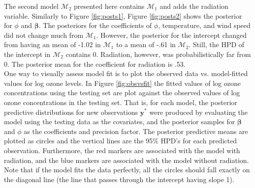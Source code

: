 \documentclass{../../tex_template/asaproc}
\newcommand{\y}{\bm y}
\newcommand{\M}{\mathcal{M}}
\begin{document}
The second model $\M_2$ presented here contains $\M_1$ and adds the radiation
variable. Similarly to Figure \ref{fig:posts1}, Figure \ref{fig:posts2} shows
the posterior for $\phi$ and $\bm\beta$.
The posteriors for the coefficients of $\phi$, temperature, and wind speed
did not change much from $\M_1$. However, the posterior for the intercept changed
from having an mean of -1.02 in $\M_1$ to a mean of -.61 in $\M_2$. Still, the
HPD of the intercept in $\M_2$ contains 0. Radiation, however, was probabilistically
far from 0. The posterior mean for the coefficient for radiation is .53. \\

One way to visually assess model fit is to plot the observed data vs.
model-fitted values for log ozone levels. In Figure \ref{fig:obsvsfit}
the fitted values of log ozone concentrations using the testing set are plot
against the observed values of log ozone concentrations in the testing set.
That is, for each model, the posterior predictive distributions for new observations
$\y^*$ were produced by evaluating the model using the testing data as the covariates,
and the posterior samples for $\bm\beta$ and $\phi$ as the coefficients and precision
factor. The posterior predictive means are plotted as circles and the vertical lines
are the 95\% HPD's for each predicted observation. Furthermore, the red markers 
are associated with the model with radiation, and the blue markers are associated with
the model without radiation. Note that if the model fits the data perfectly,
all the circles should fall exactly on the diagonal line (the line that passes
through the intercept having slope 1).\\

\end{document}
